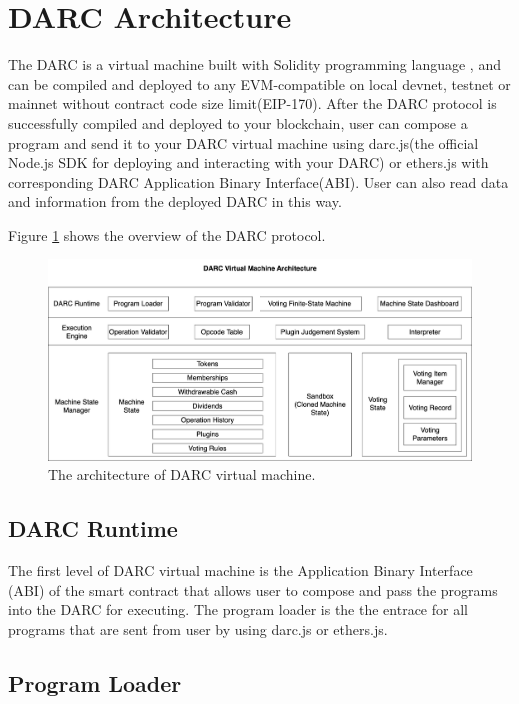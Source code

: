 \documentclass[main.tex]{subfiles}
\begin{document}
\section{DARC Architecture}


The DARC is a virtual machine built with Solidity programming language \cite{soliditylangSolidityx2014}, and can be compiled and deployed to any EVM-compatible on local devnet, testnet or mainnet without contract code size limit(EIP-170). After the DARC protocol is successfully compiled and deployed to your blockchain, user can compose a program and send it to your DARC virtual machine using darc.js(the official Node.js SDK for deploying and interacting with your DARC) or ethers.js \cite{ethersDocumentation} with corresponding DARC Application Binary Interface(ABI). User can also read data and information from the deployed DARC in this way.

Figure \ref{fig:architecture} shows the overview of the DARC protocol. 

\begin{figure}
\centering
\includegraphics[width=1\linewidth]{architecture.png}
\caption{\label{fig:architecture}The architecture of DARC virtual machine.}
\end{figure}

\subsection{DARC Runtime}

The first level of DARC virtual machine is the Application Binary Interface (ABI) of the smart contract that allows user to compose and pass the programs into the DARC for executing. The program loader is the the entrace for all programs that are sent from user by using darc.js or ethers.js. 

\subsection{Program Loader}
\end{document}
